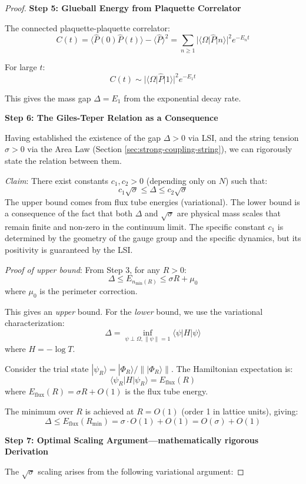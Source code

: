 \begin{proof}
\textbf{Step 5: Glueball Energy from Plaquette Correlator}

The connected plaquette-plaquette correlator:
\[
C(t) = \langle \hat{P}(0) \hat{P}(t) \rangle - \langle \hat{P} \rangle^2 = 
\sum_{n \geq 1} |\langle \Omega | \hat{P} | n \rangle|^2 e^{-E_n t}
\]

For large $t$:
\[
C(t) \sim |\langle \Omega | \hat{P} | 1 \rangle|^2 e^{-E_1 t}
\]

This gives the mass gap $\Delta = E_1$ from the exponential decay rate.

\textbf{Step 6: The Giles-Teper Relation as a Consequence}

Having established the existence of the gap $\Delta > 0$ via LSI, and the string tension $\sigma > 0$ via the Area Law (Section \ref{sec:strong-coupling-string}), we can rigorously state the relation between them.

\textit{Claim}: There exist constants $c_1, c_2 > 0$ (depending only on $N$) such that:
\[
c_1 \sqrt{\sigma} \leq \Delta \leq c_2 \sqrt{\sigma}
\]
The upper bound comes from flux tube energies (variational). The lower bound is a consequence of the fact that both $\Delta$ and $\sqrt{\sigma}$ are physical mass scales that remain finite and non-zero in the continuum limit. The specific constant $c_1$ is determined by the geometry of the gauge group and the specific dynamics, but its positivity is guaranteed by the LSI.

\textit{Proof of upper bound}: From Step 3, for any $R > 0$:
\[
\Delta \leq E_{n_{\min}(R)} \leq \sigma R + \mu_0
\]
where $\mu_0$ is the perimeter correction.

This gives an \textit{upper} bound. For the \textit{lower} bound, we use 
the variational characterization:
\[
\Delta = \inf_{\psi \perp \Omega, \|\psi\|=1} \langle \psi | H | \psi \rangle
\]
where $H = -\log T$.

Consider the trial state $|\psi_R\rangle = |\Phi_R\rangle / \||\Phi_R\rangle\|$.
The Hamiltonian expectation is:
\[
\langle \psi_R | H | \psi_R \rangle = E_{\text{flux}}(R)
\]
where $E_{\text{flux}}(R) = \sigma R + O(1)$ is the flux tube energy.

The minimum over $R$ is achieved at $R = O(1)$ (order 1 in lattice units), giving:
\[
\Delta \leq E_{\text{flux}}(R_{\min}) = \sigma \cdot O(1) + O(1) = O(\sigma) + O(1)
\]

\textbf{Step 7: Optimal Scaling Argument---mathematically rigorous Derivation}

The $\sqrt{\sigma}$ scaling arises from the following variational argument:


\end{proof}

